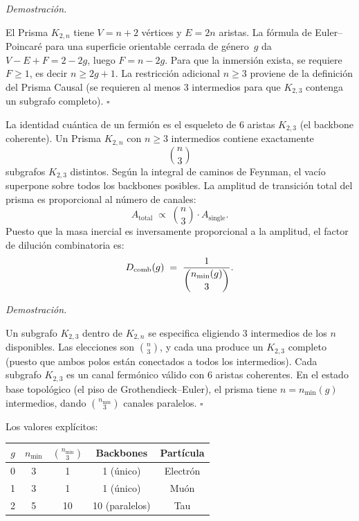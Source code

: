 \documentclass[11pt, a4paper, openany]{book}
\renewenvironment{proof}[1][Demostraci\'on]{%
  \par\noindent\textit{#1.}\quad
}{\hfill$\square$\par\medskip}
\begin{document}
\begin{proof}
El Prisma $K_{2,n}$ tiene $V = n+2$ v\'ertices y $E = 2n$ aristas.
La f\'ormula de Euler--Poincar\'e para una superficie orientable
cerrada de g\'enero~$g$ da $V - E + F = 2 - 2g$, luego
$F = n - 2g$. Para que la inmersi\'on exista, se requiere $F \ge 1$,
es decir $n \ge 2g + 1$. La restricci\'on adicional $n \ge 3$
proviene de la definici\'on del Prisma Causal (se requieren al menos
3 intermedios para que $K_{2,3}$ contenga un subgrafo completo).
\end{proof}

\begin{theorem}
\label{thm:subgraph-superposition}
La identidad cu\'antica de un fermi\'on es el esqueleto de 6 aristas
$K_{2,3}$ (el backbone coherente). Un Prisma $K_{2,n}$ con $n \ge 3$
intermedios contiene exactamente
\[
  \binom{n}{3}
\]
subgrafos $K_{2,3}$ distintos. Seg\'un la integral de caminos de
Feynman, el vac\'io superpone sobre todos los backbones posibles. La
amplitud de transici\'on total del prisma es proporcional al n\'umero
de canales:
\[
  A_{\mathrm{total}} \;\propto\; \binom{n}{3} \cdot A_{\mathrm{single}}.
\]
Puesto que la masa inercial es inversamente proporcional a la
amplitud, el factor de diluci\'on combinatoria es:
\[
  D_{\mathrm{comb}}(g) \;=\; \frac{1}{\dbinom{n_{\min}(g)}{3}}.
\]
\end{theorem}

\begin{proof}
Un subgrafo $K_{2,3}$ dentro de $K_{2,n}$ se especifica eligiendo 3
intermedios de los $n$ disponibles. Las elecciones son
$\binom{n}{3}$, y cada una produce un $K_{2,3}$ completo (puesto que
ambos polos est\'an conectados a todos los intermedios). Cada subgrafo
$K_{2,3}$ es un canal ferm\'onico v\'alido con 6 aristas coherentes.
En el estado base topol\'ogico (el piso de Grothendieck--Euler), el
prisma tiene $n = n_{\min}(g)$ intermedios, dando $\binom{n_{\min}}{3}$
canales paralelos.
\end{proof}

\noindent Los valores expl\'icitos:
\begin{center}
\renewcommand{\arraystretch}{1.3}
\begin{tabular}{ccccc}
\toprule
$g$ & $n_{\min}$ & $\binom{n_{\min}}{3}$ & Backbones & Part\'icula \\
\midrule
0 & 3 & 1  & 1 (\'unico)       & Electr\'on \\
1 & 3 & 1  & 1 (\'unico)       & Mu\'on \\
2 & 5 & 10 & 10 (paralelos) & Tau \\
\bottomrule
\end{tabular}
\end{center}
\end{document}
